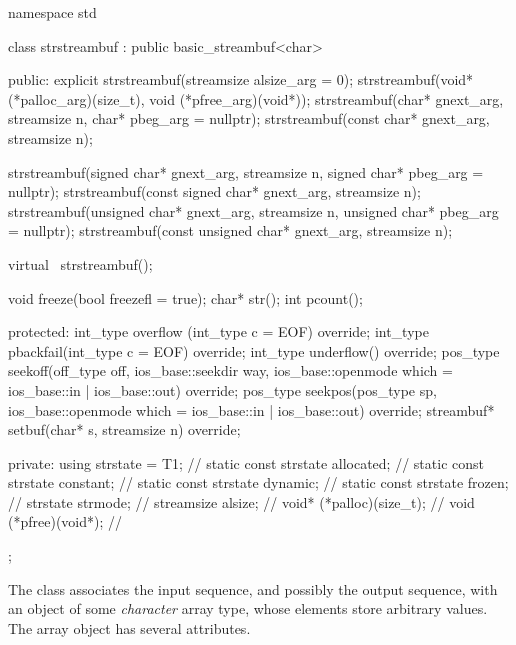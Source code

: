 %
\begin{codeblock}
namespace std {
  class strstreambuf : public basic_streambuf<char> {
  public:
    explicit strstreambuf(streamsize alsize_arg = 0);
    strstreambuf(void* (*palloc_arg)(size_t), void (*pfree_arg)(void*));
    strstreambuf(char* gnext_arg, streamsize n, char* pbeg_arg = nullptr);
    strstreambuf(const char* gnext_arg, streamsize n);

    strstreambuf(signed char* gnext_arg, streamsize n,
                 signed char* pbeg_arg = nullptr);
    strstreambuf(const signed char* gnext_arg, streamsize n);
    strstreambuf(unsigned char* gnext_arg, streamsize n,
                 unsigned char* pbeg_arg = nullptr);
    strstreambuf(const unsigned char* gnext_arg, streamsize n);

    virtual ~strstreambuf();

    void  freeze(bool freezefl = true);
    char* str();
    int   pcount();

  protected:
    int_type overflow (int_type c = EOF) override;
    int_type pbackfail(int_type c = EOF) override;
    int_type underflow() override;
    pos_type seekoff(off_type off, ios_base::seekdir way,
                     ios_base::openmode which
                      = ios_base::in | ios_base::out) override;
    pos_type seekpos(pos_type sp,
                     ios_base::openmode which
                      = ios_base::in | ios_base::out) override;
    streambuf* setbuf(char* s, streamsize n) override;

  private:
    using strstate = T1;              // \expos
    static const strstate allocated;  // \expos
    static const strstate constant;   // \expos
    static const strstate dynamic;    // \expos
    static const strstate frozen;     // \expos
    strstate strmode;                 // \expos
    streamsize alsize;                // \expos
    void* (*palloc)(size_t);          // \expos
    void (*pfree)(void*);             // \expos
  };
}
\end{codeblock}

\pnum
The class
associates the input sequence, and possibly the output sequence, with an object of some
\textit{character}
array type, whose elements store arbitrary values.
The array object has several attributes.


